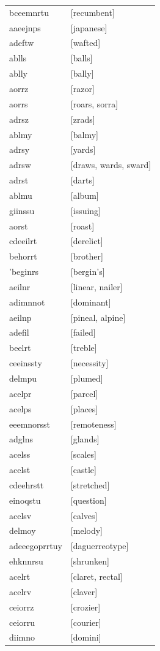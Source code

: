 \documentclass{article}
\begin{document}
\begin{tabular}{ll}
bceemnrtu & [recumbent] \\
aaeejnps & [japanese] \\
adeftw & [wafted] \\
ablls & [balls] \\
ablly & [bally] \\
aorrz & [razor] \\
aorrs & [roars, sorra] \\
adrsz & [zrads] \\
ablmy & [balmy] \\
adrsy & [yards] \\
adrsw & [draws, wards, sward] \\
adrst & [darts] \\
ablmu & [album] \\
giinssu & [issuing] \\
aorst & [roast] \\
cdeeilrt & [derelict] \\
behorrt & [brother] \\
'beginrs & [bergin's] \\
aeilnr & [linear, nailer] \\
adimnnot & [dominant] \\
aeilnp & [pineal, alpine] \\
adefil & [failed] \\
beelrt & [treble] \\
ceeinssty & [necessity] \\
delmpu & [plumed] \\
acelpr & [parcel] \\
acelps & [places] \\
eeemnorsst & [remoteness] \\
adglns & [glands] \\
acelss & [scales] \\
acelst & [castle] \\
cdeehrstt & [stretched] \\
einoqstu & [question] \\
acelsv & [calves] \\
delmoy & [melody] \\
adeeegoprrtuy & [daguerreotype] \\
ehknnrsu & [shrunken] \\
acelrt & [claret, rectal] \\
acelrv & [claver] \\
ceiorrz & [crozier] \\
ceiorru & [courier] \\
diimno & [domini] \\

\end{tabular}
\end{document}
